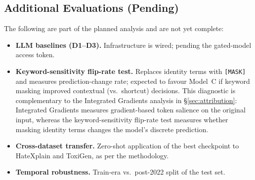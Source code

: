 \subsection{Additional Evaluations (Pending)}

The following are part of the planned analysis and are not yet complete:

\begin{itemize}[leftmargin=*,itemsep=1pt]
  \item \textbf{LLM baselines (D1--D3).} Infrastructure is wired; pending the gated-model access token.
  \item \textbf{Keyword-sensitivity flip-rate test.} Replaces identity terms with \texttt{[MASK]} and measures prediction-change rate; expected to favour Model~C if keyword masking improved contextual (vs.\ shortcut) decisions. This diagnostic is complementary to the Integrated Gradients analysis in \S\ref{sec:attribution}: Integrated Gradients measures gradient-based token salience on the original input, whereas the keyword-sensitivity flip-rate test measures whether masking identity terms changes the model's discrete prediction.
  \item \textbf{Cross-dataset transfer.} Zero-shot application of the best checkpoint to HateXplain and ToxiGen, as per the methodology.
  \item \textbf{Temporal robustness.} Train-era vs.\ post-2022 split of the test set.
\end{itemize}

